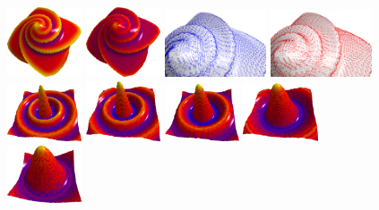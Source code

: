 \documentclass{llncs}
\begin{document}
\begin{figure}
  \vspace{-0.35cm}
  \begin{center}
    {\includegraphics[width=2.2cm]{figs/Octa_mean}}
    {\includegraphics[width=2.2cm]{figs/Octa_gaussian}}
    {\includegraphics[height=2.0cm]{figs/Octa_dir_min_zoom}}
    {\includegraphics[height=2.0cm]{figs/Octa_dir_max_zoom}}\\
    {\includegraphics[width=2.2cm]{figs/function_mean_0}}
    {\includegraphics[width=2.2cm]{figs/function_mean_1}}
    {\includegraphics[width=2.2cm]{figs/function_mean_2}}
    {\includegraphics[width=2.2cm]{figs/function_mean_3}}
    {\includegraphics[width=2.2cm]{figs/function_mean_4}}
  \end{center}


\end{figure}
\end{document}
